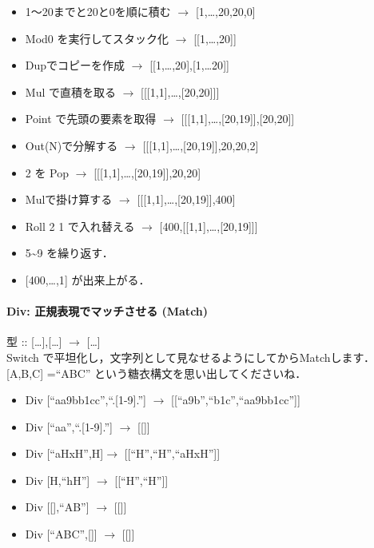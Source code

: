 \begin{itemize}
\item
  1〜20までと20と0を順に積む $\to$ {[}1,\ldots{},20,20,0{]}
\item
  Mod0 を実行してスタック化 $\to$ {[}{[}1,\ldots{},20{]}{]}
\item
  Dupでコピーを作成 $\to$
  {[}{[}1,\ldots{},20{]},{[}1,\ldots{}20{]}{]}
\item
  Mul で直積を取る $\to$
  {[}{[}{[}1,1{]},\ldots{},{[}20,20{]}{]}{]}
\item
  Point で先頭の要素を取得 $\to$
  {[}{[}{[}1,1{]},\ldots{},{[}20,19{]}{]},{[}20,20{]}{]}
\item
  Out(N)で分解する $\to$
  {[}{[}{[}1,1{]},\ldots{},{[}20,19{]}{]},20,20,2{]}
\item
  2 を Pop $\to$
  {[}{[}{[}1,1{]},\ldots{},{[}20,19{]}{]},20,20{]}
\item
  Mulで掛け算する $\to$
  {[}{[}{[}1,1{]},\ldots{},{[}20,19{]}{]},400{]}
\item
  Roll 2 1 で入れ替える $\to$
  {[}400,{[}{[}1,1{]},\ldots{},{[}20,19{]}{]}{]}
\item
  5\textasciitilde{}9 を繰り返す．
\item
  {[}400,\ldots{},1{]} が出来上がる．
\end{itemize}

\paragraph{Div: 正規表現でマッチさせる (Match)}

型 :: {[}\ldots{}{]},{[}\ldots{}{]} $\to$
{[}\ldots{}{]}\\Switch
で平坦化し，文字列として見なせるようにしてからMatchします． {[}A,B,C{]}
=``ABC'' という糖衣構文を思い出してくださいね．

\begin{itemize}
\item
  Div {[}``aa9bb1cc'',``.{[}1-9{]}.''{]} $\to$
  {[}{[}``a9b'',``b1c'',``aa9bb1cc''{]}{]}
\item
  Div {[}``aa'',``.{[}1-9{]}.''{]} $\to$ {[}{[}{]}{]}
\item
  Div {[}``aHxH'',H{]}$\to$ {[}{[}``H'',``H'',``aHxH''{]}{]}
\item
  Div {[}H,``h\textbar{}H''{]} $\to$ {[}{[}``H'',``H''{]}{]}
\item
  Div {[}{[}{]},``A\textbar{}B''{]} $\to$ {[}{[}{]}{]}
\item
  Div {[}``ABC'',{[}{]}{]} $\to$ {[}{[}{]}{]}
\end{itemize}

